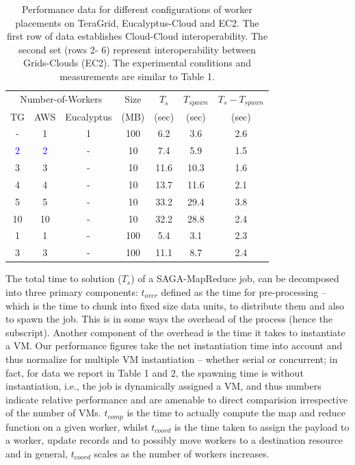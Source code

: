 \documentclass[conference,final]{IEEEtran}
\newcommand{\sagamapreduce }{SAGA-MapReduce }
\newcommand{\upp}{\vspace*{-0.5em}}
\begin{document}
\begin{table}
\upp
\begin{tabular}{ccccccc}
  \hline
  \multicolumn{3}{c}{Number-of-Workers}  &  Size   &  $T_s$  & $T_{spawn}$ & $T_s - T_{spawn}$\\   
  TG &  AWS & Eucalyptus &  (MB)  & (sec) & (sec) & (sec) \\
  \hline
  - & 1 & 1 & 100  & 6.2 & 3.6 & 2.6\\
  \hline 
  \textcolor{blue}{2} &   \textcolor{blue}{2} & - & 10 & 7.4 & 5.9 & 1.5 \\
  3 & 3 & - & 10 & 11.6 & 10.3 & 1.6 \\
  4 & 4 & - & 10 & 13.7 & 11.6 & 2.1 \\
  5 & 5 & - & 10 & 33.2 & 29.4 & 3.8 \\ 
  10 & 10 & - & 10 & 32.2 & 28.8 & 2.4 \\
  \hline
  \hline 
  1 & 1 & - & 100 & 5.4 & 3.1 & 2.3\\
  3 & 3 & - & 100 & 11.1 & 8.7 & 2.4 \\
\end{tabular}
\upp
\caption{Performance data for different configurations of worker placements
  on TeraGrid, Eucalyptus-Cloud and EC2. The first row of data
  establishes Cloud-Cloud interoperability. The second set (rows 2- 6)    represent  interoperability between Grids-Clouds (EC2). The experimental 
  conditions and measurements are similar to Table 1.}
\label{stuff}
\upp
\upp
\end{table}

The total time to solution ($T_s$) of a \sagamapreduce job, can be
decomposed into three primary components: $t_{over}$ defined as the
time for pre-processing -- which is the time to chunk into fixed size
data units, to distribute them and also to spawn the job. This is in
some ways the overhead of the process (hence the subscript).  Another
component of the overhead is the time it takes to instantiate a VM. %
Our performance figures take the net instantiation time into account
and thus normalize for multiple VM instantiation -- whether serial or
concurrent; in fact, for data we report in Table 1 and 2, the spawning
time is without instantiation, i.e., the job is dynamically assigned a
VM, and thus numbers indicate relative performance and are amenable to
direct comparision irrespective of the number of VMs.  $t_{comp}$ is
the time to actually compute the map and reduce function on a given
worker, whilst $t_{coord}$ is the time taken to assign the payload to
a worker, update records and to possibly move workers to a destination
resource and in general, $t_{coord}$ scales as the number of workers
increases. 
\end{document}
